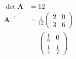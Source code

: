 \documentclass{article}
\begin{document}
\begin{align*}
  \det \mathbf{A} & = 12                          \\
  \mathbf{A}^{-1} & = \frac{1}{12} \begin{pmatrix}
                                     2 & 0 \\
                                     3 & 6
                                   \end{pmatrix} \\
                  & = \begin{pmatrix}
                        \frac{1}{6} & 0           \\
                        \frac{1}{4} & \frac{1}{2}
                      \end{pmatrix}
\end{align*}

\setcounter{subsubsection}{6}
\subsubsection{}
\end{document}
